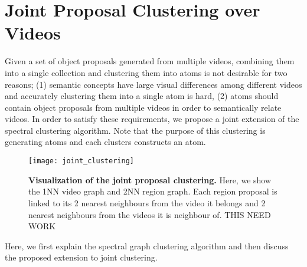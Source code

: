 \section{Joint Proposal Clustering over Videos}
\label{jointProp}
Given a set of object proposals generated from multiple videos, combining them into a single collection and clustering them into atoms is not desirable for two reasons; (1) semantic concepts have large visual differences among different videos and accurately clustering them into a single atom is hard, (2) atoms should contain object proposals from multiple videos in order to semantically relate videos. In order to satisfy these requirements, we propose a joint extension of the spectral clustering algorithm. Note that the purpose of this clustering is generating atoms and each clusters constructs an atom.

\begin{figure}[ht]
  \texttt{[image: joint\_clustering]}

  \caption{\textbf{Visualization of the joint proposal clustering.} Here, we show the 1NN video graph and 2NN region graph. Each region proposal is linked to its 2 nearest neighbours from the video it belongs and 2 nearest neighbours from the videos it is neighbour of. THIS NEED WORK}
  \label{hierProposal}
\end{figure}

Here, we first explain the spectral graph clustering algorithm and then discuss the proposed extension to joint clustering.


